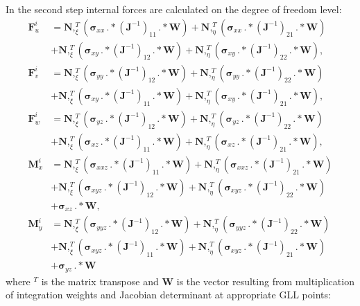\documentclass[preprint,12pt]{elsarticle}
\renewcommand{\vec}[1]{\mathbf{#1}}
\renewcommand{\bm}[1]{\mathbf{#1}}
\newcommand{\bs}[1]{\boldsymbol{#1}}
\begin{document}
	In the second step internal forces are calculated on the degree of freedom level: 
	\begin{equation}
	\begin{split}
	\vec{F}_u^i&=\bm{N},_{\xi}^T \left(\bs{\sigma}_{xx}\,.*(\vec{J}^{-1})_{11}\,.*\vec{W}\right)+\bm{N},_{\eta}^T \left(\bs{\sigma}_{xx}\,.*(\vec{J}^{-1})_{21}\,.*\vec{W}\right)\\
	&+\bm{N},_{\xi}^T \left(\bs{\sigma}_{xy}\,.*(\vec{J}^{-1})_{12}\,.*\vec{W}\right)+\bm{N},_{\eta}^T \left(\bs{\sigma}_{xy}\,.*(\vec{J}^{-1})_{22}\,.*\vec{W}\right), \\ 
	\vec{F}_v^i&=\bm{N},_{\xi}^T \left(\bs{\sigma}_{yy}\,.*(\vec{J}^{-1})_{12}\,.*\vec{W}\right)+\bm{N},_{\eta}^T \left(\bs{\sigma}_{yy}\,.*(\vec{J}^{-1})_{22}\,.*\vec{W}\right)\\
	&+\bm{N},_{\xi}^T \left(\bs{\sigma}_{xy}\,.*(\vec{J}^{-1})_{11}\,.*\vec{W}\right)+\bm{N},_{\eta}^T \left(\bs{\sigma}_{xy}\,.*(\vec{J}^{-1})_{21}\,.*\vec{W}\right),\\
	\vec{F}_w^i&=\bm{N},_{\xi}^T \left(\bs{\sigma}_{yz}\,.*(\vec{J}^{-1})_{12}\,.*\vec{W}\right)+\bm{N},_{\eta}^T \left(\bs{\sigma}_{yz}\,.*(\vec{J}^{-1})_{22}\,.*\vec{W}\right)\\
	& +\bm{N},_{\xi}^T \left(\bs{\sigma}_{xz}\,.*(\vec{J}^{-1})_{11}\,.*\vec{W}\right)+\bm{N},_{\eta}^T \left(\bs{\sigma}_{xz}\,.*(\vec{J}^{-1})_{21}\,.*\vec{W}\right),\\
	\vec{M}_x^i&=\bm{N},_{\xi}^T \left(\bs{\sigma}_{xxz}\,.*(\vec{J}^{-1})_{11}\,.*\vec{W}\right)+\bm{N},_{\eta}^T \left(\bs{\sigma}_{xxz}\,.*(\vec{J}^{-1})_{21}\,.*\vec{W}\right)\\
	&+\bm{N},_{\xi}^T \left(\bs{\sigma}_{xyz}\,.*(\vec{J}^{-1})_{12}\,.*\vec{W}\right)+\bm{N},_{\eta}^T \left(\bs{\sigma}_{xyz}\,.*(\vec{J}^{-1})_{22}\,.*\vec{W}\right)\\
	&+\bs{\sigma}_{xz}\,.*\vec{W},\\
	\vec{M}_y^i&=\bm{N},_{\xi}^T \left(\bs{\sigma}_{yyz}\,.*(\vec{J}^{-1})_{12}\,.*\vec{W}\right)+\bm{N},_{\eta}^T \left(\bs{\sigma}_{yyz}\,.*(\vec{J}^{-1})_{22}\,.*\vec{W}\right)\\
	&+\bm{N},_{\xi}^T \left(\bs{\sigma}_{xyz}\,.*(\vec{J}^{-1})_{11}\,.*\vec{W}\right)+\bm{N},_{\eta}^T \left(\bs{\sigma}_{xyz}\,.*(\vec{J}^{-1})_{21}\,.*\vec{W}\right)\\
	&+\bs{\sigma}_{yz}\,.*\vec{W}
	\label{eq:internal_forces}
	\end{split}
	\end{equation}
	where $^T$ is the matrix transpose and $\vec{W}$ is the vector resulting from multiplication of integration weights and Jacobian determinant at appropriate GLL points:
\end{document}
